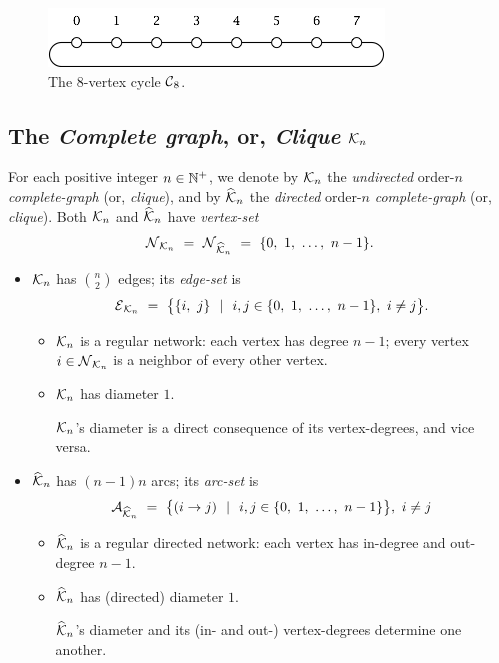 \begin{figure}[hbt]
\begin{center}
       \includegraphics[scale=0.6]{FiguresGraph/cycle}
       \caption{The $8$-vertex cycle $\mbox{$\cal C$}_8$.}
  \label{fig:cycle}
\end{center}
\end{figure}

\subsection{The {\it Complete graph}, or, {\it Clique} $\mbox{$\cal K$}_n$}
\label{sec:clique}
  
 

For each positive integer $n \in \mathbb{N}^+$, we denote by $\mbox{$\cal K$}_n$ the {\em undirected} order-$n$ {\it complete-graph} (or, {\it clique}), and by $\widehat{\mbox{$\cal K$}}_n$ the {\em directed} order-$n$ {\it complete-graph} (or, {\it clique}).  Both $\mbox{$\cal K$}_n$ and $\widehat{\mbox{$\cal K$}}_n$ have {\it vertex-set}
\[ \n_{{\cal K}_n} \ = \ \n_{\widehat{{\cal K}}_n} \ = \ \{ 0, \ 1, \ \ldots, \ n-1\}. \]
\begin{itemize}
\item
$\mbox{$\cal K$}_n$ has $\displaystyle {n \choose 2}$ edges; its {\it edge-set} is
\[ \e_{{\cal K}_n} \ = \ \big\{ \{i, \ j\} \ \ | \ \ i,j \in \{0, \ 1, \ \ldots, \ n-1\}, \ i \neq j \big\}. \]
  \begin{itemize}
  \item 
$\mbox{$\cal K$}_n$ is a regular network: each vertex has degree $n-1$; every vertex $i \in \mbox{$\cal N$}_{\mbox{{\scriptsize $\cal K$}}_n}$ is a neighbor of every other vertex.

   \medskip\item {}
$\mbox{$\cal K$}_n$ has diameter $1$.

\smallskip

$\mbox{$\cal K$}_n$'s diameter is a direct consequence of its vertex-degrees, and vice versa.
  \end{itemize}

\medskip\item
$\widehat{\mbox{$\cal K$}}_n$ has $(n-1)n$ arcs; its {\it arc-set} is
\[ \a_{\widehat{{\cal K}}_n} \ = \ 
\big\{ (i \rightarrow j) \ \ | \ \ i,j \in \{0, \ 1, \ \ldots, \ n-1\} \big\}, \ i \neq j \]
  \begin{itemize}
  \item
$\widehat{\mbox{$\cal K$}}_n$ is a regular directed network: each vertex has in-degree and out-degree $n-1$.
  \medskip\item
$\widehat{\mbox{$\cal K$}}_n$ has (directed) diameter $1$.

\smallskip

$\widehat{\mbox{$\cal K$}}_n$'s diameter and its (in- and out-) vertex-degrees determine one another.
  \end{itemize}
\end{itemize}

